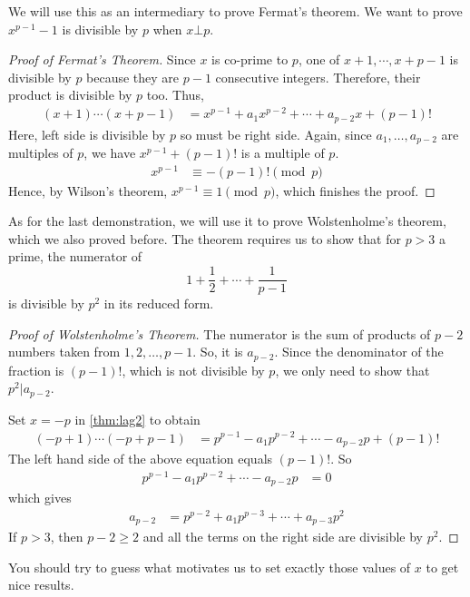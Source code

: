 \documentclass[12pt]{subfile}
\begin{document}
	We will use this as an intermediary to prove Fermat's theorem. We want to prove $x^{p-1}-1$ is divisible by $p$ when $x\bot p$.
		\begin{proof}[Proof of Fermat's Theorem]
			Since $x$ is co-prime to $p$, one of $x+1,\cdots,x+p-1$ is divisible by $p$ because they are $p-1$ consecutive integers. Therefore, their product is divisible by $p$ too. Thus,
				\begin{align*}
					(x+1)\cdots(x+p-1) & = x^{p-1}+a_1x^{p-2}+\cdots+a_{p-2}x+(p-1)!
				\end{align*}
			Here, left side is divisible by $p$ so must be right side. Again, since $a_1,\ldots,a_{p-2}$ are multiples of $p$, we have $x^{p-1}+(p-1)!$ is a multiple of $p$.
				\begin{align*}
					x^{p-1} & \equiv-(p-1)!\pmod p
				\end{align*}
			Hence, by Wilson's theorem, $x^{p-1} \equiv 1 \pmod p$, which finishes the proof.
		\end{proof}
	As for the last demonstration, we will use it to prove Wolstenholme's theorem, which we also proved before. The theorem requires us to show that for $p>3$ a prime, the numerator of $$1+\dfrac{1}{2}+\cdots+\dfrac{1}{p-1}$$ is divisible by $p^2$ in its reduced form.
		\begin{proof}[Proof of Wolstenholme's Theorem]
			The numerator is the sum of products of $p-2$ numbers taken from $1, 2, \ldots, p-1$. So, it is $a_{p-2}$. Since the denominator of the fraction is $(p-1)!$, which is not divisible by $p$, we only need to show that $p^2|a_{p-2}$.

			Set $x=-p$ in \autoref{thm:lag2} to obtain
				\begin{align*}
					(-p+1)\cdots(-p+p-1)
						& = p^{p-1}-a_1p^{p-2}+\cdots-a_{p-2}p+(p-1)!
				\end{align*}
			The left hand side of the above equation equals $(p-1)!$. So
				\begin{align*}
					p^{p-1}-a_1p^{p-2}+\cdots-a_{p-2}p
						& = 0
				\end{align*}
			which gives
				\begin{align*}
					a_{p-2}
						& = p^{p-2}+a_1p^{p-3}+\cdots+a_{p-3}p^2
				\end{align*}
			If $p>3$, then $p-2\geq 2$ and all the terms on the right side are divisible by $p^2$.
		\end{proof}

		\begin{note}
			You should try to guess what motivates us to set exactly those values of $x$ to get nice results.
		\end{note}
\end{document}
